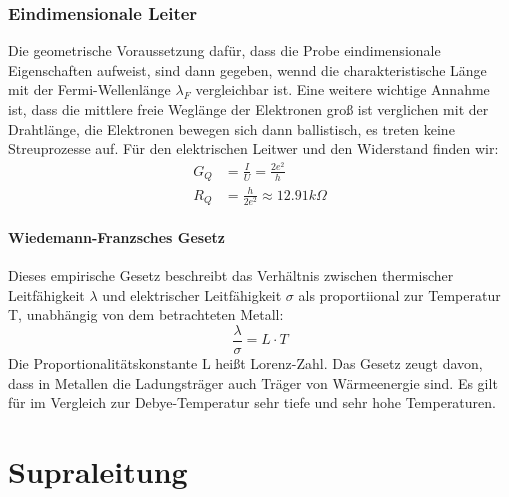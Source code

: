 \documentclass[11pt]{article}
\begin{document}
\subsubsection{Eindimensionale Leiter}
Die geometrische Voraussetzung dafür, dass die Probe eindimensionale
Eigenschaften aufweist, sind dann gegeben, wennd die charakteristische Länge
mit der Fermi-Wellenlänge $\lambda_F$ vergleichbar ist. Eine weitere wichtige
Annahme ist, dass die mittlere freie Weglänge der Elektronen groß ist verglichen
mit der Drahtlänge, die Elektronen bewegen sich dann ballistisch, es treten
keine Streuprozesse auf.
Für den elektrischen Leitwer und den Widerstand finden wir:
\begin{equation}
  \begin{align}
    G_Q&=\frac{I}{U}=\frac{2e^2}{h}\\
    R_Q&=\frac{h}{2e^2}\approx 12.91 k\Omega
  \end{align}
\end{equation}
\noindent \paragraph{Wiedemann-Franzsches Gesetz}
Dieses empirische Gesetz beschreibt das Verhältnis zwischen thermischer
Leitfähigkeit $\lambda$ und elektrischer Leitfähigkeit $\sigma$ als
proportiional zur Temperatur T, unabhängig von dem betrachteten Metall:
\begin{equation}
  \frac{\lambda}{\sigma}=L\cdot T
\end{equation}
Die Proportionalitätskonstante L heißt Lorenz-Zahl. Das Gesetz zeugt davon, dass
in Metallen die Ladungsträger auch Träger von Wärmeenergie sind. Es gilt für
im Vergleich zur Debye-Temperatur sehr tiefe und sehr hohe Temperaturen.
\section{Supraleitung}
\end{document}
